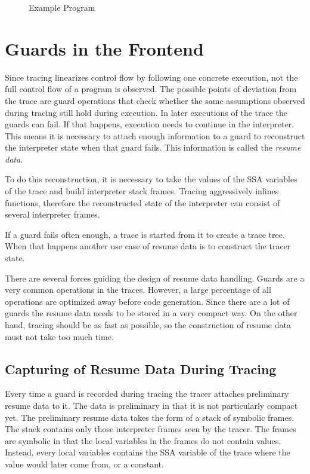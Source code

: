 \documentclass[10pt,preprint]{sigplanconf}
\begin{document}

\begin{figure}
    
    \caption{Example Program}
    \label{fig:trace-log}
\end{figure}

\section{Guards in the Frontend} %
\label{sec:Resume Data}

Since tracing linearizes control flow by following one concrete execution,
not the full control flow of a program is observed.
The possible points of deviation from the trace are guard operations
that check whether the same assumptions observed during tracing still hold during execution.
In later executions of the trace the guards can fail.
If that happens, execution needs to continue in the interpreter.
This means it is necessary to attach enough information to a guard
to reconstruct the interpreter state when that guard fails.
This information is called the \emph{resume data}.

To do this reconstruction, it is necessary to take the values of the SSA
variables of the trace and build interpreter stack frames.  Tracing
aggressively inlines functions, therefore the reconstructed state of the
interpreter can consist of several interpreter frames.

If a guard fails often enough, a trace is started from it
to create a trace tree.
When that happens another use case of resume data
is to construct the tracer state.

There are several forces guiding the design of resume data handling.
Guards are a very common operations in the traces.
However, a large percentage of all operations
are optimized away before code generation.
Since there are a lot of guards
the resume data needs to be stored in a very compact way.
On the other hand, tracing should be as fast as possible,
so the construction of resume data must not take too much time.

\subsection{Capturing of Resume Data During Tracing}
\label{sub:capturing}

Every time a guard is recorded during tracing
the tracer attaches preliminary resume data to it.
The data is preliminary in that it is not particularly compact yet.
The preliminary resume data takes the form of a stack of symbolic frames.
The stack contains only those interpreter frames seen by the tracer.
The frames are symbolic in that the local variables in the frames
do not contain values.
Instead, every local variables contains the SSA variable of the trace
where the value would later come from, or a constant.
\end{document}
